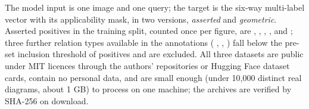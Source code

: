 The model input is one image and one query; the target is the six-way multi-label vector with its applicability mask, in two versions, \emph{asserted} and \emph{geometric}. Asserted positives in the training split, counted once per figure, are \nTrainParallel{} , \nTrainPerpendicular{} , \nTrainEqualLength{} , \nTrainOnCircle{} , \nTrainCollinear{}  and \nTrainTangent{} ; three further relation types available in the annotations ( \nTrainMidpoint,  \nTrainEqualAngle,  \nTrainPerpBisector) fall below the pre-set inclusion threshold of \tierTwoMinPositives{} positives and are excluded. All three datasets are public under MIT licences through the authors' repositories or Hugging Face dataset cards, contain no personal data, and are small enough (under 10,000 distinct real diagrams, about 1 GB) to process on one machine; the archives are verified by SHA-256 on download.
